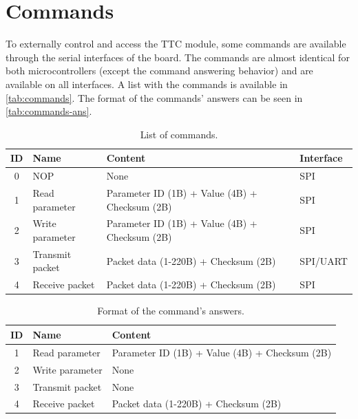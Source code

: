 \section{Commands} \label{sec:commands}

To externally control and access the TTC module, some commands are available through the serial interfaces of the board. The commands are almost identical for both microcontrollers (except the command answering behavior) and are available on all interfaces. A list with the commands is available in \autoref{tab:commands}. The format of the commands' answers can be seen in \autoref{tab:commands-ans}.

\begin{table}[!ht]
    \centering
    \begin{tabular}{clll}
        \toprule[1.5pt]
        \textbf{ID} & \textbf{Name} & \textbf{Content} & \textbf{Interface}\\
        \midrule
        0   & NOP               & None                                           & SPI \\
        1   & Read parameter    & Parameter ID (1B) + Value (4B) + Checksum (2B) & SPI \\
        2   & Write parameter   & Parameter ID (1B) + Value (4B) + Checksum (2B) & SPI \\
        3   & Transmit packet   & Packet data (1-220B) + Checksum (2B)           & SPI/UART \\
        4   & Receive packet    & Packet data (1-220B) + Checksum (2B)           & SPI \\
        \bottomrule[1.5pt]
    \end{tabular}
    \caption{List of commands.}
    \label{tab:commands}
\end{table}

\begin{table}[!ht]
    \centering
    \begin{tabular}{cll}
        \toprule[1.5pt]
        \textbf{ID} & \textbf{Name} & \textbf{Content}\\
        \midrule
        1   & Read parameter    & Parameter ID (1B) + Value (4B) + Checksum (2B) \\
        2   & Write parameter   & None \\
        3   & Transmit packet   & None \\
        4   & Receive packet    & Packet data (1-220B) + Checksum (2B) \\
        \bottomrule[1.5pt]
    \end{tabular}
    \caption{Format of the command's answers.}
    \label{tab:commands-ans}
\end{table}

